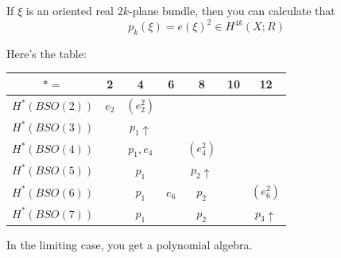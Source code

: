 If $\xi$ is an oriented real $2k$-plane bundle, then you can calculate that
$$
p_k(\xi) = e(\xi)^2\in H^{4k}(X;R)
$$

Here's the table:
\begin{center}
    \begin{tabular}{ c|c c c c c c} 
	\hline
	$\ast = $ & 2 & 4 & 6 & 8 & 10 & 12\\
	\hline
	$H^\ast(BSO(2))$ & $e_2$ & $(e_2^2)$ & & & &\\
	$H^\ast(BSO(3))$ & & $p_1\uparrow$ & & & &\\
	$H^\ast(BSO(4))$ & & $p_1,e_4$ & & $(e_4^2)$ & &\\
	$H^\ast(BSO(5))$ & & $p_1$ & & $p_2\uparrow$ & &\\
	$H^\ast(BSO(6))$ & & $p_1$ & $e_6$ & $p_2$ & & $(e_6^2)$\\
	$H^\ast(BSO(7))$ & & $p_1$ & & $p_2$ & & $p_3\uparrow$
    \end{tabular}
\end{center}
In the limiting case, you get a polynomial algebra.
